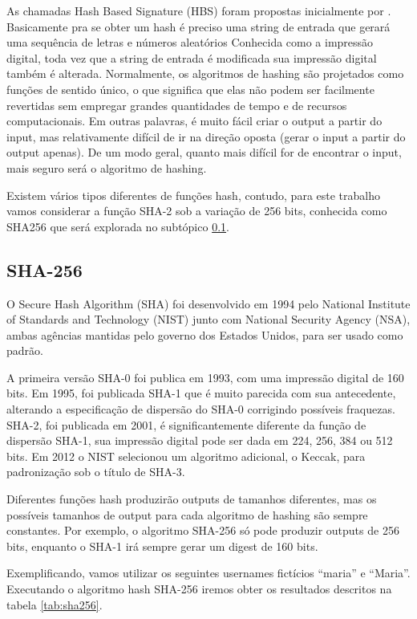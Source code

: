 \documentclass[12pt, a4paper]{report}
\begin{document}
As chamadas Hash Based Signature (HBS) foram propostas inicialmente por \cite{lamport1979constructing}. Basicamente pra se obter um hash é preciso uma string de entrada  que gerará uma sequência de letras e números aleatórios Conhecida como a impressão digital, toda vez que a string de entrada é modificada sua impressão digital também é alterada.
Normalmente, os algoritmos de hashing  são projetados como funções de sentido único, o que significa que elas não podem ser facilmente revertidas sem empregar grandes quantidades de tempo e de recursos computacionais. Em outras palavras, é muito fácil criar o output a partir do input, mas relativamente difícil de ir na direção oposta (gerar o input a partir do output apenas). De um modo geral, quanto mais difícil for de encontrar o input, mais seguro será o algoritmo de hashing.

Existem vários tipos diferentes de funções hash, contudo, para este trabalho vamos considerar a função SHA-2 sob a variação de 256 bits, conhecida como SHA256 que será explorada no subtópico \ref{subsec:sha256}.

\subsection{SHA-256}
\label{subsec:sha256}

O Secure Hash Algorithm (SHA) foi desenvolvido em 1994 pelo National Institute of Standards and Technology (NIST) junto com National Security Agency (NSA), ambas agências mantidas pelo governo dos Estados Unidos,  para ser usado como padrão.

A primeira versão SHA-0 foi publica em 1993, com uma impressão digital de 160 bits. Em 1995, foi publicada SHA-1 que é muito parecida com sua antecedente, alterando a especificação de dispersão do SHA-0 corrigindo possíveis fraquezas. SHA-2, foi publicada em 2001, é significantemente diferente da função de dispersão SHA-1, sua impressão digital pode ser dada em 224, 256, 384 ou 512 bits. Em 2012 o NIST selecionou um algoritmo adicional, o Keccak, para padronização sob o título de SHA-3.

Diferentes funções hash produzirão outputs de tamanhos diferentes, mas os possíveis tamanhos de output para cada algoritmo de hashing são sempre constantes. Por exemplo, o algoritmo SHA-256 só pode produzir outputs de 256 bits, enquanto o SHA-1 irá sempre gerar um digest de 160 bits.

Exemplificando, vamos utilizar os seguintes usernames fictícios “maria” e “Maria”. Executando o algoritmo hash SHA-256 iremos obter os resultados descritos na tabela \ref{tab:sha256}.
\end{document}
